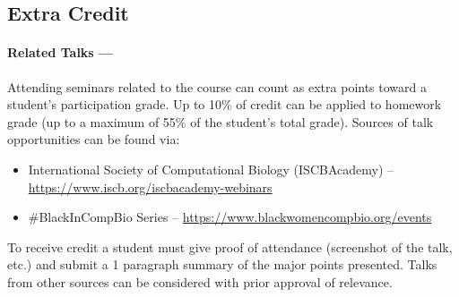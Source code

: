 \documentclass[12pt]{scrartcl}
\begin{document}
\subsection{Extra Credit}
%

\paragraph{Related Talks ---} Attending seminars related to the course can count as extra points toward a student's participation grade. 
Up to 10\% of credit can be applied to homework grade (up to a maximum of 55\% of the student's total grade). 
Sources of talk opportunities can be found via: 
\begin{itemize}
\item International Society of Computational Biology (ISCBAcademy) -- \\\url{https://www.iscb.org/iscbacademy-webinars}
\item \#BlackInCompBio Series -- \url{https://www.blackwomencompbio.org/events}
\end{itemize}
To receive credit a student must give proof of attendance (screenshot of the talk, etc.) and submit a 1 paragraph summary of the major points presented. 
Talks from other sources can be considered with prior approval of relevance. 

\end{document}
